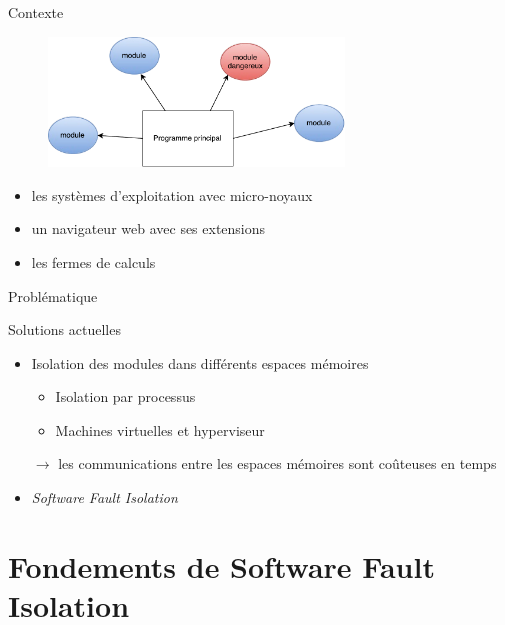\documentclass[10pt,usenames,dvipsnames]{beamer}
\begin{document}
\begin{frame}{Contexte}
	\begin{figure}
		\centering
		\includegraphics[width=0.7\textwidth]{module.pdf}
	\end{figure}
	\begin{itemize}
		\item les systèmes d'exploitation avec micro-noyaux
		\item un navigateur web avec ses extensions
		\item les fermes de calculs
	\end{itemize}
	
\end{frame}

\begin{frame}{Problématique}
\end{frame}

\begin{frame}{Solutions actuelles}
	\begin{itemize}
		\item Isolation des modules dans différents espaces mémoires
		\begin{itemize}
			\item Isolation par processus
			\item Machines virtuelles et hyperviseur
		\end{itemize}

	\alert{$\rightarrow$ les communications entre les espaces mémoires sont coûteuses en temps}
		\item \textit{Software Fault Isolation}
	\end{itemize}	
\end{frame}


\section{Fondements de Software Fault Isolation}
\end{document}
